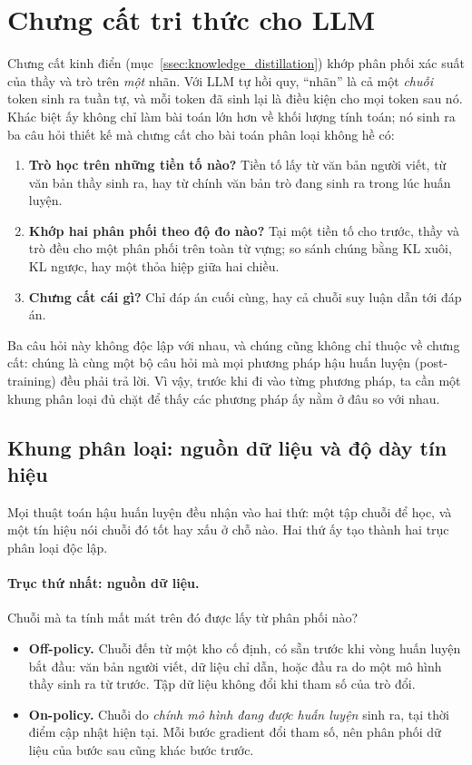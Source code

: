 
\section{Chưng cất tri thức cho LLM}
\label{sec:llm_distillation}

Chưng cất kinh điển (mục~\ref{ssec:knowledge_distillation}) khớp phân phối xác suất của thầy và trò trên \emph{một} nhãn. Với LLM tự hồi quy, ``nhãn'' là cả một \emph{chuỗi} token sinh ra tuần tự, và mỗi token đã sinh lại là điều kiện cho mọi token sau nó. Khác biệt ấy không chỉ làm bài toán lớn hơn về khối lượng tính toán; nó sinh ra ba câu hỏi thiết kế mà chưng cất cho bài toán phân loại không hề có:

\begin{enumerate}
	\item \textbf{Trò học trên những tiền tố nào?} Tiền tố lấy từ văn bản người viết, từ văn bản thầy sinh ra, hay từ chính văn bản trò đang sinh ra trong lúc huấn luyện.
	\item \textbf{Khớp hai phân phối theo độ đo nào?} Tại một tiền tố cho trước, thầy và trò đều cho một phân phối trên toàn từ vựng; so sánh chúng bằng KL xuôi, KL ngược, hay một thỏa hiệp giữa hai chiều.
	\item \textbf{Chưng cất cái gì?} Chỉ đáp án cuối cùng, hay cả chuỗi suy luận dẫn tới đáp án.
\end{enumerate}

Ba câu hỏi này không độc lập với nhau, và chúng cũng không chỉ thuộc về chưng cất: chúng là cùng một bộ câu hỏi mà mọi phương pháp hậu huấn luyện (post-training) đều phải trả lời. Vì vậy, trước khi đi vào từng phương pháp, ta cần một khung phân loại đủ chặt để thấy các phương pháp ấy nằm ở đâu so với nhau.

\subsection{Khung phân loại: nguồn dữ liệu và độ dày tín hiệu}
\label{ssec:post_training_quadrants}

Mọi thuật toán hậu huấn luyện đều nhận vào hai thứ: một tập chuỗi để học, và một tín hiệu nói chuỗi đó tốt hay xấu ở chỗ nào. Hai thứ ấy tạo thành hai trục phân loại độc lập.

\paragraph{Trục thứ nhất: nguồn dữ liệu.} Chuỗi mà ta tính mất mát trên đó được lấy từ phân phối nào?
\begin{itemize}
	\item \textbf{Off-policy.} Chuỗi đến từ một kho cố định, có sẵn trước khi vòng huấn luyện bắt đầu: văn bản người viết, dữ liệu chỉ dẫn, hoặc đầu ra do một mô hình thầy sinh ra từ trước. Tập dữ liệu không đổi khi tham số của trò đổi.
	\item \textbf{On-policy.} Chuỗi do \emph{chính mô hình đang được huấn luyện} sinh ra, tại thời điểm cập nhật hiện tại. Mỗi bước gradient đổi tham số, nên phân phối dữ liệu của bước sau cũng khác bước trước.
\end{itemize}

